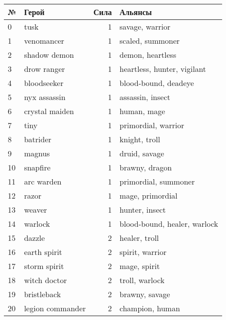 \documentclass{article}
\begin{document}
\begin{table}
\center
\resizebox{!}{10cm} {
\begin{tabular}{llrl}
\label{aliances}
{№} &                 Герой &  Сила &                       Альянсы \\
\midrule
0  &                 tusk &      1 &               savage, warrior  \\
1  &           venomancer &      1 &               scaled, summoner \\
2  &         shadow demon &      1 &               demon, heartless \\
3  &          drow ranger &      1 &    heartless, hunter, vigilant \\
4  &          bloodseeker &      1 &           blood-bound, deadeye \\
5  &         nyx assassin &      1 &               assassin, insect \\
6  &       crystal maiden &      1 &                    human, mage \\
7  &                 tiny &      1 &           primordial, warrior  \\
8  &             batrider &      1 &                  knight, troll \\
9  &               magnus &      1 &                  druid, savage \\
10 &             snapfire &      1 &                 brawny, dragon \\
11 &           arc warden &      1 &           primordial, summoner \\
12 &                razor &      1 &               mage, primordial \\
13 &               weaver &      1 &                 hunter, insect \\
14 &              warlock &      1 &  blood-bound, healer, warlock  \\
15 &               dazzle &      2 &                  healer, troll \\
16 &         earth spirit &      2 &               spirit, warrior  \\
17 &         storm spirit &      2 &                   mage, spirit \\
18 &         witch doctor &      2 &                troll, warlock  \\
19 &          bristleback &      2 &                 brawny, savage \\
20 &     legion commander &      2 &                champion, human \\

\end{tabular}}
\end{table}
\end{document}
